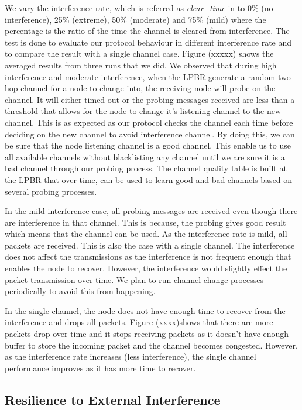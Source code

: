 We vary the interference rate, which is referred as \textit{clear\_time} in \cite{Boano:2010:MSM:2127940.2127963} to 0\% (no interference), 25\% (extreme), 50\% (moderate) and 75\% (mild) where the percentage is the ratio of the time the channel is cleared from interference. The test is done to evaluate our protocol behaviour in different interference rate and to compare the result with a single channel case. Figure (xxxxx) shows the averaged results from three runs that we did. We observed that during high interference and moderate interference, when the LPBR generate a random two hop channel for a node to change into, the receiving node will probe on the channel. It will either timed out or the probing messages received are less than a threshold that allows for the node to change it's listening channel to the new channel. This is as expected as our protocol checks the channel each time before deciding on the new channel to avoid interference channel. By doing this, we can be sure that the node listening channel is a good channel. This enable us to use all available channels without blacklisting any channel until we are sure it is a bad channel through our probing process. The channel quality table is built at the LPBR that over time, can be used to learn good and bad channels based on several probing processes. 

In the mild interference case, all probing messages are received even though there are interference in that channel. This is because, the probing gives good result which means that the channel can be used. As the interference rate is mild, all packets are received. This is also the case with a single channel. The interference does not affect the transmissions as the interference is not frequent enough that enables the node to recover. However, the interference would slightly effect the packet transmission over time. We plan to run channel change processes periodically to avoid this from happening. %

In the single channel, the node does not have enough time to recover from the interference and drops all packets. Figure (xxxx)shows that there are more packets drop over time and it stops receiving packets as it doesn't have enough buffer to store the incoming packet and the channel becomes congested. However, as the interference rate increases (less interference), the single channel performance improves as it has more time to recover.



\subsection{Resilience to External Interference}